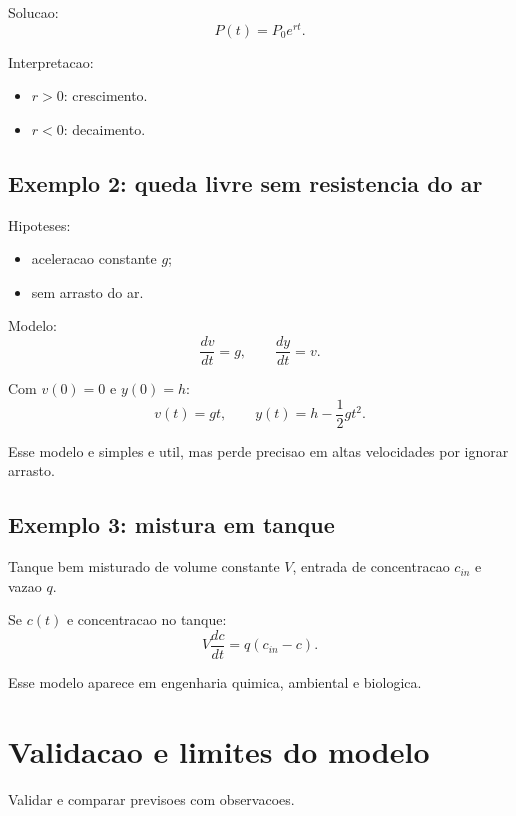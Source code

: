 \documentclass[12pt,a4paper,oneside]{book}
\theoremstyle{definition}
\begin{document}
Solucao:
\begin{equation}
P(t)=P_0e^{rt}.
\end{equation}

Interpretacao:
\begin{itemize}
    \item $r>0$: crescimento.
    \item $r<0$: decaimento.
\end{itemize}

\subsection{Exemplo 2: queda livre sem resistencia do ar}

Hipoteses:
\begin{itemize}
    \item aceleracao constante $g$;
    \item sem arrasto do ar.
\end{itemize}

Modelo:
\begin{equation}
\frac{dv}{dt}=g, \qquad \frac{dy}{dt}=v.
\end{equation}

Com $v(0)=0$ e $y(0)=h$:
\begin{equation}
v(t)=gt, \qquad y(t)=h-\frac{1}{2}gt^2.
\end{equation}

Esse modelo e simples e util, mas perde precisao em altas velocidades por ignorar arrasto.

\subsection{Exemplo 3: mistura em tanque}

Tanque bem misturado de volume constante $V$, entrada de concentracao $c_{in}$ e vazao $q$.

Se $c(t)$ e concentracao no tanque:
\begin{equation}
V\frac{dc}{dt}=q(c_{in}-c).
\end{equation}

Esse modelo aparece em engenharia quimica, ambiental e biologica.

\section{Validacao e limites do modelo}

Validar e comparar previsoes com observacoes.
\end{document}
